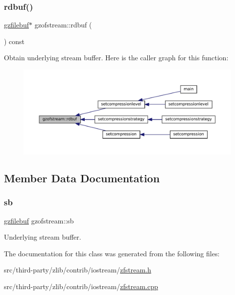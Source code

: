 \subsubsection{\texorpdfstring{rdbuf()}{rdbuf()}}
{\footnotesize\ttfamily \mbox{\hyperlink{classgzfilebuf}{gzfilebuf}}$\ast$ gzofstream\+::rdbuf (\begin{DoxyParamCaption}{ }\end{DoxyParamCaption}) const\hspace{0.3cm}{\ttfamily [inline]}}

Obtain underlying stream buffer. Here is the caller graph for this function\+:
\nopagebreak
\begin{figure}[H]
\begin{center}
\leavevmode
\includegraphics[width=350pt]{classgzofstream_a2fef74202b114357f41cfeb28f1d2acc_icgraph}
\end{center}
\end{figure}


\subsection{Member Data Documentation}
\mbox{\label{classgzofstream_a33c8d570f3753ed277eacba50c76badc}} 
\subsubsection{\texorpdfstring{sb}{sb}}
{\footnotesize\ttfamily \mbox{\hyperlink{classgzfilebuf}{gzfilebuf}} gzofstream\+::sb\hspace{0.3cm}{\ttfamily [private]}}

Underlying stream buffer. 

The documentation for this class was generated from the following files\+:\begin{DoxyCompactItemize}
\item 
src/third-\/party/zlib/contrib/iostream/\mbox{\hyperlink{zfstream_8h}{zfstream.\+h}}\item 
src/third-\/party/zlib/contrib/iostream/\mbox{\hyperlink{zfstream_8cpp}{zfstream.\+cpp}}\end{DoxyCompactItemize}
